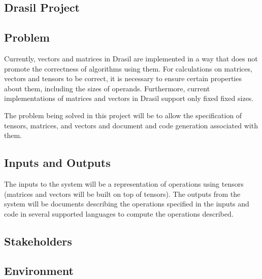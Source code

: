 \documentclass{article}
\begin{document}
\subsection{Drasil Project}



\subsection{Problem}
Currently, vectors and matrices in Drasil are implemented in a way that does not 
promote the correctness of algorithms using them. For calculations on matrices,
vectors and tensors to be correct, it is necessary to ensure certain properties
about them, including the sizes of operands. Furthermore, current implementations
of matrices and vectors in Drasil support only fixed fixed sizes. 

The problem being solved in this project will be to allow the specification of
tensors, matrices, and vectors and document and code  generation associated with them.

\subsection{Inputs and Outputs}

The inputs to the system will be a representation of operations using tensors
(matrices and vectors will be built on top of tensors). The outputs from the
system will be documents describing the operations specified in the inputs and
code in several supported languages to compute the operations described.


\subsection{Stakeholders}

\subsection{Environment}
\end{document}
